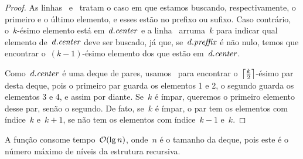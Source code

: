 \documentclass[main.tex]{subfiles}
\begin{document}
\begin{proof}
As linhas~ e~ tratam o caso em que estamos buscando, respectivamente, o primeiro e o último elemento, e esses estão no prefixo ou sufixo. Caso contrário, o~$k$-ésimo elemento está em~$d.\V{center}$ e a linha~ arruma~$k$ para indicar qual elemento de~$d.\V{center}$ deve ser buscado, já que, se~$d.\V{preffix}$ é não nulo, temos que encontrar o~$(k-1)$-ésimo elemento dos que estão em~$d.\V{center}$.

Como~$d.\V{center}$ é uma deque de pares, usamos~ para encontrar o~$\ceil*{\frac{k}{2}}$-ésimo par desta deque, pois o primeiro par guarda os elementos 1 e 2, o segundo guarda os elementos 3 e 4, e assim por diante. Se~$k$ é ímpar, queremos o primeiro elemento desse par, senão o segundo. De fato, se~$k$ é ímpar, o par tem os elementos com índice~$k$ e~$k+1$, se não tem os elementos com índice~$k-1$ e~$k$.
\end{proof}

A função consome tempo~$\Oh(\lg n)$, onde~$n$ é o tamanho da deque, pois este é o número máximo de níveis da estrutura recursiva.
\end{document}
